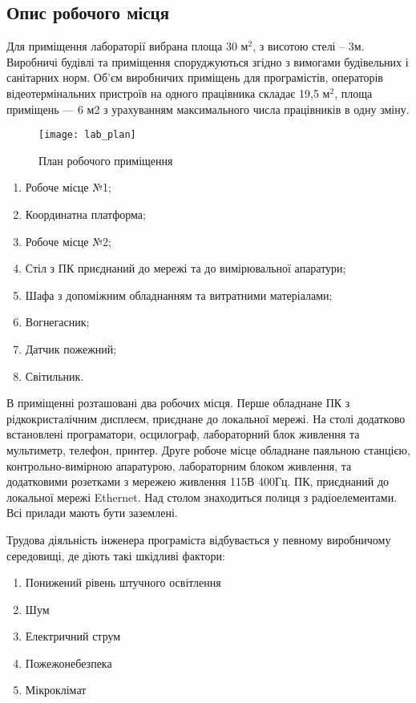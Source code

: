 \subsection{Опис робочого місця}
Для приміщення лабораторії вибрана площа 30 $\text{м}^2$, з висотою стелі -- 3м. Виробничі будівлі та приміщення споруджуються згідно з вимогами будівельних і санітарних норм. Об’єм виробничих приміщень для програмістів, операторів відеотермінальних пристроїв на одного працівника складає 19,5 $\text{м}^2$, площа приміщень — 6 м2 з урахуванням максимального числа працівників в одну зміну. 

\begin{figure}[H]
\centering
\texttt{[image: lab\_plan]}
\caption{План робочого приміщення}\label{fig:lab_plan}
\end{figure}

\begin{enumerate}
 \item Робоче місце №1;
 \item Координатна платформа;
 \item Робоче місце №2;
 \item Стіл з ПК приєднаний до мережі та до вимірювальної апаратури;
 \item Шафа з допоміжним обладнанням та витратними матеріалами;
 \item Вогнегасник;
 \item Датчик пожежний;
 \item Світильник.
\end{enumerate}

В приміщенні розташовані два робочих місця. Перше обладнане ПК з рідкокристалічним дисплеєм, приєднане до локальної мережі. На столі додатково встановлені програматори, осцилограф, лабораторний блок живлення та мультиметр, телефон, принтер. Друге робоче місце обладнане паяльною станцією, контрольно-вимірною апаратурою, лабораторним блоком живлення, та додатковими розетками з мережею живлення 115В 400Гц. ПК, приєднаний до локальної мережі Ethernet. Над столом знаходиться полиця з радіоелементами. Всі прилади мають бути заземлені.

Трудова діяльність інженера програміста відбувається у певному виробничому середовищі, де діють такі шкідливі фактори: 
\begin{enumerate}
  \item Понижений рівень штучного освітлення 
  \item Шум
  \item Електричний струм
  \item Пожежонебезпека
  \item Мікроклімат

\end{enumerate}

